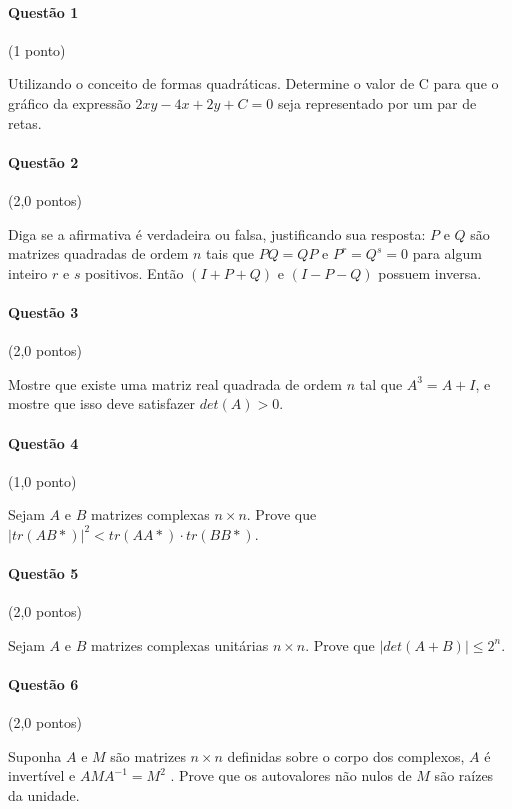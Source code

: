 \documentclass[12pt,a4paper]{article}
\newcommand{\modu}[1]{\vert #1 \vert}
\begin{document}
\paragraph{Questão 1} (1 ponto)

Utilizando o conceito de formas quadráticas. Determine o valor de C para que o gráfico da expressão $2xy - 4x + 2y + C = 0$ seja representado por um par de retas.

\paragraph{Questão 2} (2,0 pontos)

Diga se a afirmativa é verdadeira ou falsa, justificando sua resposta: $P$ e $Q$ são matrizes quadradas de ordem $n$ tais que $PQ=QP$ e $P^r=Q^s=0$ para algum inteiro $r$ e $s$ positivos. Então $(I+P+Q)$ e $(I-P-Q)$ possuem inversa.



\paragraph{Questão 3} (2,0 pontos)

Mostre que existe uma matriz real quadrada de ordem $n$ tal que $A^3=A + I$, e mostre que
isso deve satisfazer $det (A) >0$.

\paragraph{Questão 4} (1,0 ponto)

Sejam $A$ e $B$ matrizes complexas $n \times n$. Prove que $\modu{tr (AB*)}^2 < tr (AA*)\cdot tr (BB*)$.
\paragraph{Questão 5} (2,0 pontos)

Sejam $A$ e $B$ matrizes complexas unitárias $n \times n$. Prove que $\modu{det (A+B)} \leq 2^n$.

\paragraph{Questão 6} (2,0 pontos)

Suponha $A$ e $M$ são matrizes $n \times n$ definidas sobre o corpo dos complexos, $A$ é
invertível e $AMA^{-1} = M^2$ . Prove que os autovalores não nulos de $M$ são raízes da
unidade.

\newpage
\end{document}
